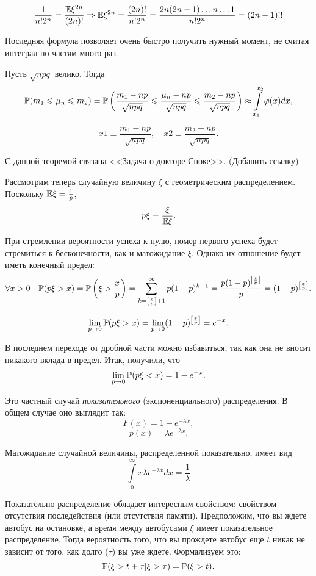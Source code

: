 \documentclass[../TV&MS.tex]{subfiles}
\begin{document}
	$$\frac{1}{n!2^n} = \frac{\mathbb{E}\xi^{2n}}{(2n)!} \Rightarrow \mathbb{E}\xi^{2n} = 
	\frac{(2n)!}{n!2^n} = \frac{2n(2n-1)\ldots n \ldots 1}{n!2^n} = (2n-1)!!$$

	Последняя формула позволяет очень быстро получить нужный момент, 
	не считая интеграл по частям много раз.

\begin{Th}
	Пусть $\sqrt{npq}$ велико. Тогда
	$$\mathbb{P}(m_1 \leqslant \mu_n \leqslant m_2) = \mathbb{P}\left(\frac{m_1 - np}{\sqrt{npq}} \leqslant 
	\frac{\mu_n - np}{\sqrt{npq}} \leqslant \frac{m_2 - np}{\sqrt{npq}}\right) \approx 
	\int\limits_{x_1}^{x_2}\varphi(x)dx,$$

	$$x1 \equiv \frac{m_1 - np}{\sqrt{npq}}, \quad x2 \equiv\frac{m_2 - np}{\sqrt{npq}}.$$
\end{Th}

	С данной теоремой связана <<Задача о докторе Споке>>. (Добавить ссылку)

	Рассмотрим теперь случайную величину $\xi$ с геометрическим распределением. 
	Поскольку $\mathbb{E}\xi = \frac1p$, 
	$$p\xi=\frac{\xi}{\mathbb{E}\xi}.$$

	При стремлении вероятности успеха к нулю, номер первого успеха будет стремиться к бесконечности, 
	как и матожидание $\xi$. Однако их отношение будет иметь конечный предел:
	$$\forall x > 0 \quad \mathbb{P}(p\xi > x) = \mathbb{P}\left(\xi > \frac{x}p\right) = 
	\sum\limits_{k = \left[\frac{x}{p}\right] + 1}^{\infty}p(1-p)^{k-1} = 
	\frac{p(1-p)^{\left[\frac{x}p\right]}}p = (1-p)^{\left[\frac{x}p\right]}.$$ 
	
	$$\lim\limits_{p \to 0} \mathbb{P}(p\xi > x) = 
	\lim\limits_{p \to 0}(1-p)^{\left[\frac{x}p\right]} = e^{-x}.$$
	
	В последнем переходе от дробной части можно избавиться, так как она не вносит 
	никакого вклада в предел. Итак, получили, что
	$$\lim\limits_{p \to 0} \mathbb{P}(p\xi < x) = 1 - e^{-x}.$$

	Это частный случай \emph{показательного} (экспоненциального) распределения. 
	В общем случае оно выглядит так:
	$$F(x) = 1 - e^{-\lambda x},$$
	$$p(x) = \lambda e^{-\lambda x}.$$

	Матожидание случайной величины, распределенной показательно, имеет вид
	$$\int\limits_0^{\infty} x\lambda e^{-\lambda x}dx = \frac1{\lambda}$$

	Показательно распределение обладает интересным свойством: свойством отсутствия 
	последействия (или отсутствия памяти). Предположим, что вы ждете автобус на 
	остановке, а время между автобусами $\xi$ имеет показательное распределение. 
	Тогда вероятность того, что вы прождете автобус еще $t$ никак не зависит от того, 
	как долго ($\tau$) вы уже ждете. Формализуем это:
	$$ \mathbb{P}(\xi > t + \tau | \xi > \tau) = \mathbb{P}(\xi > t).$$
\end{document}

